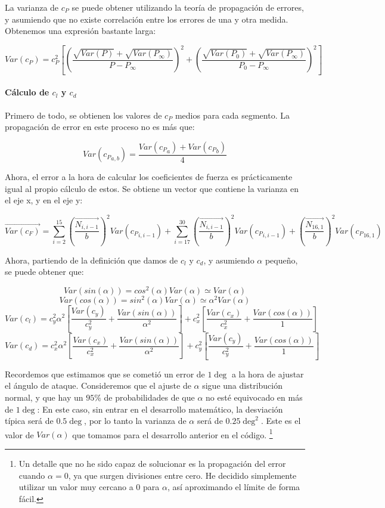 \documentclass{article}
\begin{document}
La varianza de $c_P$ se puede obtener utilizando la teoría de propagación de errores, y asumiendo que no existe correlación
entre los errores de una y otra medida. Obtenemos una expresión bastante larga:

$$Var(c_P) = c_P^2 \left[ \left(\frac{\sqrt{Var(P)} + \sqrt{Var(P_{\infty})}}{P - P_{\infty}}\right)^2 +
 \left(\frac{\sqrt{Var(P_0)} + \sqrt{Var(P_{\infty})}}{P_0 - P_{\infty}}\right)^2\right]$$ 

\paragraph{Cálculo de $c_l$ y $c_d$}

Primero de todo, se obtienen los valores de $c_P$ medios para cada segmento. La propagación de error en este proceso no es más que:

$$Var({c_P}_{a,b}) = \frac{Var({c_P}_a) + Var({c_P}_b)}{4}$$

Ahora, el error a la hora de calcular los coeficientes de fuerza es prácticamente igual al propio cálculo de estos. 
Se obtiene un vector que contiene la varianza en el eje x, y en el eje y:

$$\vec{Var(c_F)} = \sum_{i = 2}^{15} \left(\frac{\vec{N_{i, i-1}}}{b}\right)^2 Var({c_P}_{i, i-1}) + 
\sum_{i=17}^{30} \left(\frac{\vec{N_{i, i-1}}}{b}\right)^2 Var({c_P}_{i, i-1}) +
\left(\frac{\vec{N_{16, 1}}}{b}\right)^2 Var({c_P}_{16, 1}) $$

Ahora, partiendo de la definición que damos de $c_l$ y $c_d$, y asumiendo $\alpha$ pequeño, se puede obtener que:

$$Var(sin(\alpha)) = cos^2(\alpha) Var(\alpha) \simeq Var(\alpha)$$
$$Var(cos(\alpha)) = sin^2(\alpha) Var(\alpha) \simeq \alpha^2Var(\alpha)$$
$$Var(c_l) = 
c_y^2 \alpha^2 \left[\frac{Var(c_y)}{c_y^2} + \frac{Var(sin(\alpha))}{\alpha^2}\right]
+ 
c_x^2 \left[\frac{Var(c_x)}{c_x^2} + \frac{Var(cos(\alpha))}{1}\right]
$$
$$Var(c_d) = 
c_x^2 \alpha^2 \left[\frac{Var(c_x)}{c_x^2} + \frac{Var(sin(\alpha))}{\alpha^2}\right]
+ 
c_y^2 \left[\frac{Var(c_y)}{c_y^2} + \frac{Var(cos(\alpha))}{1}\right]
$$

Recordemos que estimamos que se cometió un error  de $1\deg$ a la hora de ajustar el ángulo de ataque. Consideremos 
que el ajuste de $\alpha$ sigue una distribución normal, y que hay un $95\%$ de probabilidades de que $\alpha$ no esté equivocado
en más de $1\deg$: En este caso, sin entrar en el desarrollo matemático, 
la desviación típica será de $0.5\deg$, por lo tanto la varianza de $\alpha$ será de $0.25\deg^2$. Este es el valor de 
$Var(\alpha)$ que tomamos para el desarrollo anterior en el código. \footnote{
    Un detalle que no he sido capaz de solucionar es la propagación del error cuando $\alpha = 0$, ya que surgen divisiones entre
    cero. He decidido simplemente utilizar un valor muy cercano a 0 para $\alpha$, así aproximando el límite de forma fácil.
}
\end{document}
